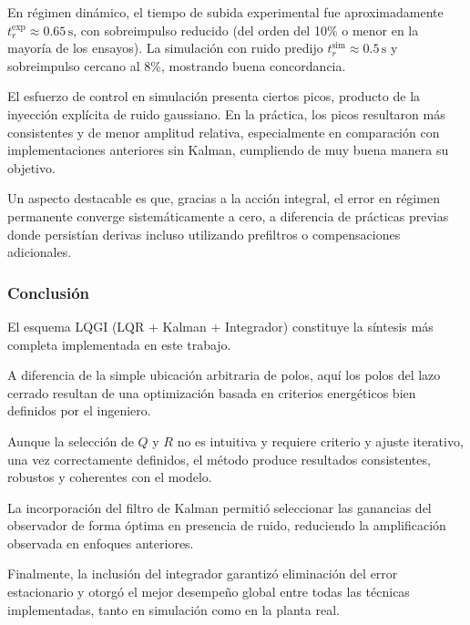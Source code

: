 En régimen dinámico, el tiempo de subida experimental fue aproximadamente
\(t_r^{\text{exp}} \approx 0.65\,\text{s}\), con sobreimpulso reducido
(del orden del 10\% o menor en la mayoría de los ensayos).
La simulación con ruido predijo \(t_r^{\text{sim}} \approx 0.5\,\text{s}\)
y sobreimpulso cercano al 8\%, mostrando buena concordancia.

El esfuerzo de control en simulación presenta ciertos picos,
producto de la inyección explícita de ruido gaussiano. En la práctica,
los picos resultaron más consistentes y de menor amplitud relativa,
especialmente en comparación con implementaciones anteriores sin Kalman, cumpliendo de muy buena manera su objetivo.

Un aspecto destacable es que, gracias a la acción integral,
el error en régimen permanente converge sistemáticamente a cero,
a diferencia de prácticas previas donde persistían derivas
incluso utilizando prefiltros o compensaciones adicionales.

\subsubsection{Conclusión}

El esquema LQGI (LQR + Kalman + Integrador) constituye la síntesis más
completa implementada en este trabajo.

A diferencia de la simple ubicación arbitraria de polos, aquí los polos
del lazo cerrado resultan de una optimización basada en criterios
energéticos bien definidos por el ingeniero.

Aunque la selección de \(Q\) y \(R\) no es intuitiva y requiere
criterio y ajuste iterativo, una vez correctamente definidos,
el método produce resultados consistentes, robustos y coherentes
con el modelo.

La incorporación del filtro de Kalman permitió seleccionar las ganancias
del observador de forma óptima en presencia de ruido, reduciendo la
amplificación observada en enfoques anteriores.

Finalmente, la inclusión del integrador garantizó eliminación del error
estacionario y otorgó el mejor desempeño global entre todas las técnicas
implementadas, tanto en simulación como en la planta real.

